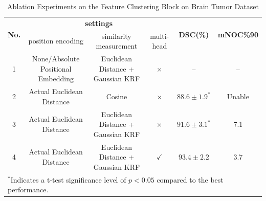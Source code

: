 \documentclass[journal,twoside,web]{ieeecolor}
\begin{document}
\begin{table}[!t]
\caption{Ablation Experiments on the Feature Clustering Block on Brain Tumor Dataset}
\label{table3}
\centering
\setlength{\tabcolsep}{12pt}
\renewcommand{\arraystretch}{1.8}
\begin{tabular}{c c c c c c}
\hline
\multirow{2}{*}{\textbf{No.}} &
\multicolumn{3}{c}{\textbf{settings}} &
\multirow{2}{*}{\textbf{DSC(\%)}} &
\multirow{2}{*}{\textbf{mNOC\%90}} \\
\cline{2-4}
 & position encoding & similarity measurement & multi-head & & \\
\hline
1 & None/Absolute Positional Embedding & Euclidean Distance + Gaussian KRF      & $\times$     & --                 & -- \\
2 & Actual Euclidean Distance          & Cosine                                 & $\times$     & $88.6\pm1.9^{*}$   & Unable \\
3 & Actual Euclidean Distance          & Euclidean Distance + Gaussian KRF      & $\times$     & $91.6\pm3.1^{*}$   & 7.1 \\
4 & Actual Euclidean Distance          & Euclidean Distance + Gaussian KRF      & $\checkmark$ & $93.4\pm2.2$       & 3.7 \\
\hline
\multicolumn{6}{l}{\footnotesize ${}^{*}$Indicates a t-test significance level of $p{<}0.05$ compared to the best performance.}
\end{tabular}
\end{table}
\end{document}
